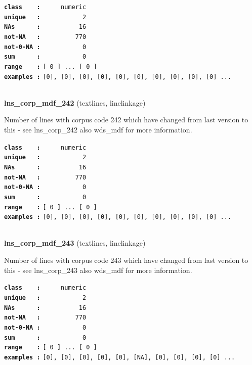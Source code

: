 \documentclass[]{article}
\begin{document}
\textbf{\texttt{class\ \ \ \ :}} \texttt{~~~~~numeric}\\
\textbf{\texttt{unique\ \ \ :}} \texttt{~~~~~~~~~~~2}\\
\textbf{\texttt{NAs\ \ \ \ \ \ :}} \texttt{~~~~~~~~~~16}\\
\textbf{\texttt{not-NA\ \ \ :}} \texttt{~~~~~~~~~770}\\
\textbf{\texttt{not-0-NA\ :}} \texttt{~~~~~~~~~~~0}\\
\textbf{\texttt{sum\ \ \ \ \ \ :}} \texttt{~~~~~~~~~~~0}\\
\textbf{\texttt{range\ \ \ \ :}}
\texttt{{[}\ 0\ {]}\ ...\ {[}\ 0\ {]}}\\
\textbf{\texttt{examples\ :}}
\texttt{{[}0{]},\ {[}0{]},\ {[}0{]},\ {[}0{]},\ {[}0{]},\ {[}0{]},\ {[}0{]},\ {[}0{]},\ {[}0{]},\ {[}0{]}\ ...}\\

~

\textbf{lns\_corp\_mdf\_242} (textlines, linelinkage)

Number of lines with corpus code 242 which have changed from last
version to this - see lns\_corp\_242 also wds\_mdf for more information.

\textbf{\texttt{class\ \ \ \ :}} \texttt{~~~~~numeric}\\
\textbf{\texttt{unique\ \ \ :}} \texttt{~~~~~~~~~~~2}\\
\textbf{\texttt{NAs\ \ \ \ \ \ :}} \texttt{~~~~~~~~~~16}\\
\textbf{\texttt{not-NA\ \ \ :}} \texttt{~~~~~~~~~770}\\
\textbf{\texttt{not-0-NA\ :}} \texttt{~~~~~~~~~~~0}\\
\textbf{\texttt{sum\ \ \ \ \ \ :}} \texttt{~~~~~~~~~~~0}\\
\textbf{\texttt{range\ \ \ \ :}}
\texttt{{[}\ 0\ {]}\ ...\ {[}\ 0\ {]}}\\
\textbf{\texttt{examples\ :}}
\texttt{{[}0{]},\ {[}0{]},\ {[}0{]},\ {[}0{]},\ {[}0{]},\ {[}0{]},\ {[}0{]},\ {[}0{]},\ {[}0{]},\ {[}0{]}\ ...}\\

~

\textbf{lns\_corp\_mdf\_243} (textlines, linelinkage)

Number of lines with corpus code 243 which have changed from last
version to this - see lns\_corp\_243 also wds\_mdf for more information.

\textbf{\texttt{class\ \ \ \ :}} \texttt{~~~~~numeric}\\
\textbf{\texttt{unique\ \ \ :}} \texttt{~~~~~~~~~~~2}\\
\textbf{\texttt{NAs\ \ \ \ \ \ :}} \texttt{~~~~~~~~~~16}\\
\textbf{\texttt{not-NA\ \ \ :}} \texttt{~~~~~~~~~770}\\
\textbf{\texttt{not-0-NA\ :}} \texttt{~~~~~~~~~~~0}\\
\textbf{\texttt{sum\ \ \ \ \ \ :}} \texttt{~~~~~~~~~~~0}\\
\textbf{\texttt{range\ \ \ \ :}}
\texttt{{[}\ 0\ {]}\ ...\ {[}\ 0\ {]}}\\
\textbf{\texttt{examples\ :}}
\texttt{{[}0{]},\ {[}0{]},\ {[}0{]},\ {[}0{]},\ {[}0{]},\ {[}NA{]},\ {[}0{]},\ {[}0{]},\ {[}0{]},\ {[}0{]}\ ...}\\
\end{document}
